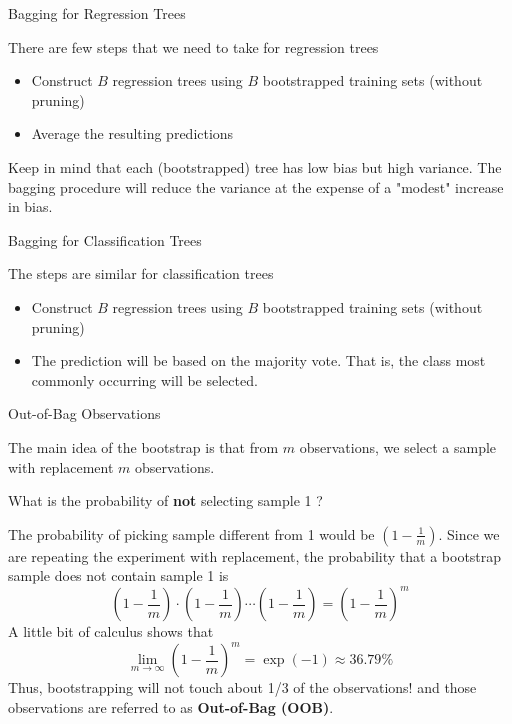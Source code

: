 \documentclass{beamer}
\begin{document}
	
	



\begin{frame}{Bagging for Regression Trees}
	
	There are few steps that we need to take for regression trees
	\begin{itemize}
		\item Construct $B$ regression trees using $B$ bootstrapped training sets (without pruning)
		\item Average the resulting predictions
	\end{itemize}
Keep in mind that each (bootstrapped) tree has low bias but high variance. The bagging procedure will reduce the variance at the expense of a "modest" increase in bias. 
\end{frame}

\begin{frame}{Bagging for Classification Trees}
	
	The steps are similar for classification trees
	\begin{itemize}
		\item Construct $B$ regression trees using $B$ bootstrapped training sets (without pruning)
		\item The prediction will be based on the majority vote. That is, the class most commonly occurring will be selected.
	\end{itemize}

\end{frame}

\begin{frame}{Out-of-Bag Observations}
	
	The main idea of the bootstrap is that from $m$ observations, we select a sample with replacement $m$ observations.
	
	What is the probability of {\bf not} selecting sample 1 ?
	
	The probability of picking sample different from 1 would be 
	$(1 - \frac{1}{m})$. Since we are repeating the experiment with replacement, the probability that a bootstrap sample does not contain sample 1 is 
	\begin{equation*}
		\left(1 - \frac{1}{m}\right) \cdot \left(1 - \frac{1}{m}\right) \cdots \left(1 - \frac{1}{m}\right) = \left(1 - \frac{1}{m}\right)^m
	\end{equation*}
	 A little bit of calculus shows that 
	 \begin{equation*}
	 \lim_{m\to\infty}\left(1-\frac{1}{m}\right)^m= \exp(-1) \approx 36.79\%
	 \end{equation*}
Thus, bootstrapping will not touch about 1/3 of the observations!
and those observations are referred to as {\bf Out-of-Bag (OOB)}.  
\end{frame}
\end{document}

